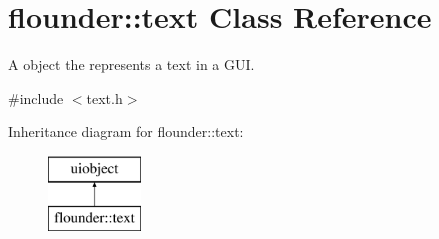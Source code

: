 \hypertarget{classflounder_1_1text}{}\section{flounder\+:\+:text Class Reference}
\label{classflounder_1_1text}


A object the represents a text in a G\+UI.  




{\ttfamily \#include $<$text.\+h$>$}

Inheritance diagram for flounder\+:\+:text\+:\begin{figure}[H]
\begin{center}
\leavevmode
\includegraphics[height=2.000000cm]{classflounder_1_1text}
\end{center}
\end{figure}
